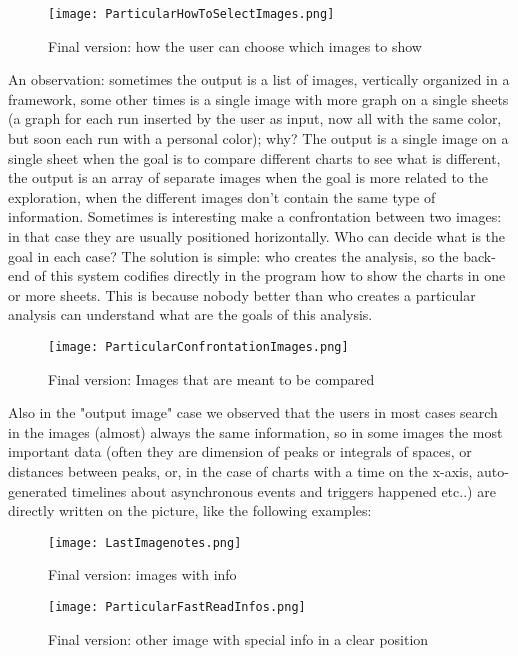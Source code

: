 \begin{figure}[H]
\centering
\texttt{[image: ParticularHowToSelectImages.png]} 
\caption{Final version: how the user can choose which images to show}
\end{figure}


An observation: sometimes the output is a list of images, vertically organized in a framework, some other times is a single image with more graph on a single sheets (a graph for each run inserted by the user as input, now all with the same color, but soon each run with a personal color); why?
The output is a single image on a single sheet when the goal is to compare different charts to see what is different, the output is an array of separate images when the goal is more related to the exploration, when the different images don't contain the same type of information. Sometimes is interesting make a confrontation between two images: in that case they are usually positioned horizontally. Who can decide what is the goal in each case? The solution is simple: who creates the analysis, so the back-end of this system codifies directly in the program how to show the charts in one or more sheets. This is because nobody better than who creates a particular analysis can understand what are the goals of this analysis.


\begin{figure}[H]
\centering
\texttt{[image: ParticularConfrontationImages.png]} 
\caption{Final version: Images that are meant to be compared}
\end{figure}   


Also in the "output image" case we observed that the users in most cases search in the images (almost) always the same information, so in some images the most important data (often they are dimension of peaks or integrals of spaces, or distances between peaks, or, in the case of charts with a time on the x-axis, auto-generated timelines about asynchronous events and triggers happened etc..) are directly written on the picture, like the following examples:

\begin{figure}[H]
\centering
\texttt{[image: LastImagenotes.png]} 
\caption{Final version: images with info}
\end{figure}   

\begin{figure}[H]
\centering
\texttt{[image: ParticularFastReadInfos.png]} 
\caption{Final version: other image with special info in a clear position }
\end{figure}   

